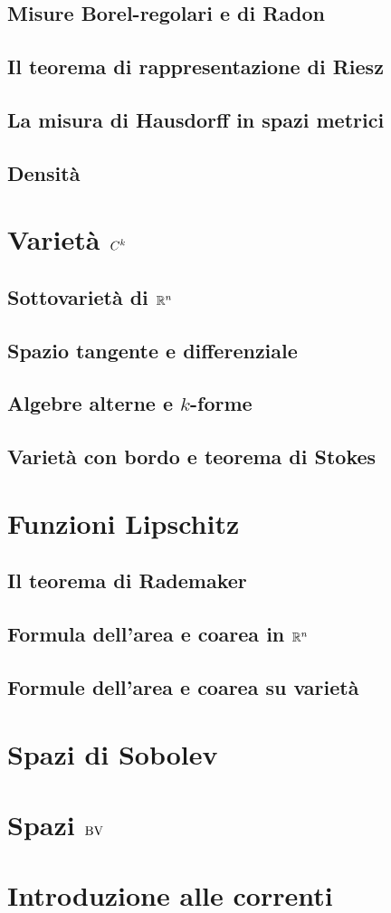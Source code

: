 \documentclass[a4paper, 11pt]{book}
\begin{document}
\section{Misure Borel-regolari e di Radon}
\section{Il teorema di rappresentazione di Riesz}
\section{La misura di Hausdorff in spazi metrici}
\section{Densità}

\chapter{Varietà $C^{k}$}
\section{Sottovarietà di $\mathbb{R}^n$}
\section{Spazio tangente e differenziale}
\section{Algebre alterne e $k$-forme}
\section{Varietà con bordo e teorema di Stokes}

\chapter{Funzioni Lipschitz}
\section{Il teorema di Rademaker}
\section{Formula dell'area e coarea in $\mathbb{R}^n$}
\section{Formule dell'area e coarea su varietà}

\chapter{Spazi di Sobolev}

\chapter{Spazi $\operatorname{BV}$}

\chapter{Introduzione alle correnti}
\backmatter
\printbibliography
\printindex
\end{document}
